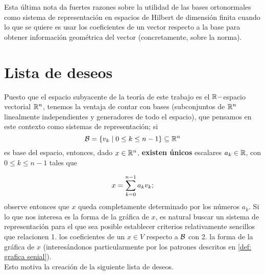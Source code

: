 Esta última nota da fuertes razones sobre la utilidad
de las bases ortonormales como sistema de representación
en espacios de Hilbert 
de dimensión finita cuando lo que se quiere es
usar los coeficientes de un vector respecto a la base
para obtener información geométrica del vector
(concretamente, sobre la norma).


\section{Lista de deseos}
Puesto que el espacio subyacente de 
la teoría de este trabajo es el $\mathbb{R}-$espacio vectorial 
$\mathbb{R}^{n}$, tenemos la ventaja de contar con
bases (subconjuntos de $\mathbb{R}^{n}$ linealmente
independientes y generadores de todo el espacio),
que pensamos en este contexto como sistemas
de representación; si 
\begin{equation}
\label{eq0: 13Feb}
\mathcal{B}=\{v_{k}
 \hspace{0.1cm} |
\hspace{0.1cm} 0 \leq k \leq n-1 \} 
\subseteq \mathbb{R}^{n}
\end{equation}
es base del espacio, entonces, dado $x \in \mathbb{R}^{n}$, 
\textbf{existen únicos}
escalares
$a_{k} \in \mathbb{R}$, con $0 \leq k \leq n-1$
tales que

\begin{equation}
\label{eq1: 13Feb}
x = \sum\limits_{k=0}^{n-1}a_{k}v_{k};
\end{equation}
observe entonces que $x$ 
queda completamente determinado por los
números $a_{k}$. Si lo que nos interesa es
la forma de la gráfica de $x$, es natural 
buscar un sistema de representación
para el que sea posible establecer criterios
relativamente sencillos
que relacionen 1. los coeficientes de un $x \in V$
respecto a $\mathcal{B}$ con
2. la forma de la gráfica de $x$ (interesándonos
particularmente por los patrones descritos en 
\ref{def: grafica senial}). \\
 

Esto motiva la
creación de la siguiente lista de deseos.


